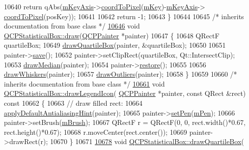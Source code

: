 \begin{DoxyCode}
10640     \textcolor{keywordflow}{return} qAbs(\hyperlink{a00024_a692421b963472fa6e16156a74ba96832}{mKeyAxis}->\hyperlink{a00025_a985ae693b842fb0422b4390fe36d299a}{coordToPixel}(\hyperlink{a00050_a86fd1d3be5c5bc11d11eda7517069af4}{mKey})-\hyperlink{a00024_a692421b963472fa6e16156a74ba96832}{mKeyAxis}->
      \hyperlink{a00025_a985ae693b842fb0422b4390fe36d299a}{coordToPixel}(posKey));
10641   
10642   \textcolor{keywordflow}{return} -1;
10643 \}
10644 
10645 \textcolor{comment}{/* inherits documentation from base class */}
\hypertarget{a00115_source_l10646}{}\hyperlink{a00050_a753b62761217dd6b92f8a29e286a1317}{10646} \textcolor{keywordtype}{void} \hyperlink{a00050_a753b62761217dd6b92f8a29e286a1317}{QCPStatisticalBox::draw}(\hyperlink{a00047}{QCPPainter} *painter)
10647 \{
10648   QRectF quartileBox;
10649   \hyperlink{a00050_a9ad0abdb154fefb04e9872f0db8e2ec7}{drawQuartileBox}(painter, &quartileBox);
10650   
10651   painter->\hyperlink{a00047_a8fd6821ee6fecbfa04444c9062912abd}{save}();
10652   painter->setClipRect(quartileBox, Qt::IntersectClip);
10653   \hyperlink{a00050_a16fef8bc19e5a09d82033edcfe919495}{drawMedian}(painter);
10654   painter->\hyperlink{a00047_a64908e6298d5bbd83457dc987cc3a022}{restore}();
10655   
10656   \hyperlink{a00050_a6f8d093ec7e404529388d02da4c72b34}{drawWhiskers}(painter);
10657   \hyperlink{a00050_a60ebb332a497f51ace837767db5105b9}{drawOutliers}(painter);
10658 \}
10659 
10660 \textcolor{comment}{/* inherits documentation from base class */}
\hypertarget{a00115_source_l10661}{}\hyperlink{a00050_af010b2f9e32b8183984486e4d66e46c4}{10661} \textcolor{keywordtype}{void} \hyperlink{a00050_af010b2f9e32b8183984486e4d66e46c4}{QCPStatisticalBox::drawLegendIcon}(
      \hyperlink{a00047}{QCPPainter} *painter, \textcolor{keyword}{const} QRect &rect)\textcolor{keyword}{ const}
10662 \textcolor{keyword}{}\{
10663   \textcolor{comment}{// draw filled rect:}
10664   \hyperlink{a00024_a76e9d6cc7972dc1528f526d163766aca}{applyDefaultAntialiasingHint}(painter);
10665   painter->\hyperlink{a00047_af9c7a4cd1791403901f8c5b82a150195}{setPen}(\hyperlink{a00024_a67bc0622fd1b9fa14e54c14922dcec66}{mPen});
10666   painter->setBrush(\hyperlink{a00024_a33f00674c0161c13315ab9da0895418e}{mBrush});
10667   QRectF r = QRectF(0, 0, rect.width()*0.67, rect.height()*0.67);
10668   r.moveCenter(rect.center());
10669   painter->drawRect(r);
10670 \}
10671 
\hypertarget{a00115_source_l10678}{}\hyperlink{a00050_a9ad0abdb154fefb04e9872f0db8e2ec7}{10678} \textcolor{keywordtype}{void} \hyperlink{a00050_a9ad0abdb154fefb04e9872f0db8e2ec7}{QCPStatisticalBox::drawQuartileBox}(

\end{DoxyCode}
